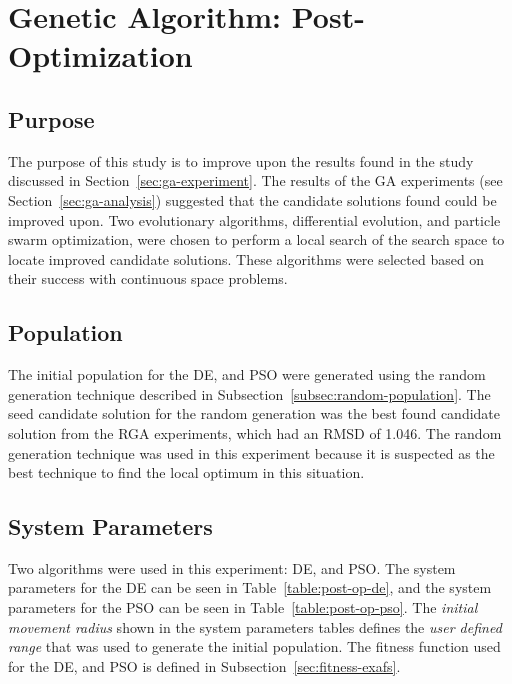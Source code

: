 \section{Genetic Algorithm: Post-Optimization}
\label{sec:ga-post-op}

\subsection{Purpose}

The purpose of this study is to improve upon the results found in the study discussed in Section~\ref{sec:ga-experiment}. The results of the GA experiments (see Section~\ref{sec:ga-analysis}) suggested that the candidate solutions found could be improved upon. Two evolutionary algorithms, differential evolution, and particle swarm optimization, were chosen to perform a local search of the search space to locate improved candidate solutions. These algorithms were selected based on their success with continuous space problems.

\subsection{Population}

The initial population for the DE, and PSO were generated using the random generation technique described in Subsection~\ref{subsec:random-population}. The seed candidate solution for the random generation was the best found candidate solution from the RGA experiments, which had an RMSD of 1.046. The random generation technique was used in this experiment because it is suspected as the best technique to find the local optimum in this situation.


\subsection{System Parameters}

Two algorithms were used in this experiment: DE, and PSO. The system parameters for the DE can be seen in Table~\ref{table:post-op-de}, and the system parameters for the PSO can be seen in Table~\ref{table:post-op-pso}. The \textit{initial movement radius} shown in the system parameters tables defines the \textit{user defined range} that was used to generate the initial population. The fitness function used for the DE, and PSO is defined in Subsection~\ref{sec:fitness-exafs}.

